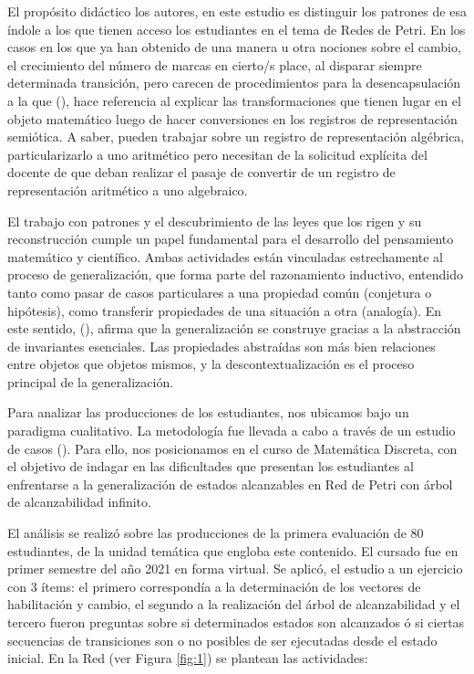 \documentclass[oneside,spanish]{amsart}
\numberwithin{equation}{section}
\theoremstyle{definition}
\begin{document}
El propósito didáctico los autores, en este estudio es distinguir los patrones de esa índole a los que tienen acceso los estudiantes en el tema de Redes de Petri. En los casos en los que ya han obtenido de una manera u otra nociones sobre el cambio, el crecimiento del número de marcas en cierto/s place, al disparar siempre determinada transición, pero carecen de procedimientos para la desencapsulación a la que (\citet{baez18}), hace referencia al explicar las transformaciones que tienen lugar en el objeto matemático luego de hacer conversiones en los registros de representación semiótica. A saber, pueden trabajar sobre un registro de representación algébrica, particularizarlo a uno aritmético pero necesitan de la solicitud explícita del docente de que deban realizar el pasaje de convertir de un registro de representación aritmético a uno algebraico.

El trabajo con patrones y el descubrimiento de las leyes que los rigen y su reconstrucción cumple un papel fundamental para el desarrollo del pensamiento matemático y científico. Ambas actividades están vinculadas estrechamente al proceso de generalización, que forma parte del razonamiento inductivo, entendido tanto como pasar de casos particulares a una propiedad común (conjetura o hipótesis), como transferir propiedades de una situación a otra (analogía). En este sentido, (\citet{polya66}), afirma que la generalización se construye gracias a la abstracción de invariantes esenciales. Las propiedades abstraídas son más bien relaciones entre objetos que objetos mismos, y la descontextualización es el proceso principal de la generalización.

Para analizar las producciones de los estudiantes, nos ubicamos bajo un paradigma cualitativo. La metodología fue llevada a cabo a través de un estudio de casos (\citet{stake78}). Para ello, nos posicionamos en el curso de Matemática Discreta, con el objetivo de indagar en las dificultades que presentan los estudiantes al enfrentarse a la generalización de estados alcanzables en Red de Petri con árbol de alcanzabilidad infinito.

El análisis se realizó sobre las producciones de la primera evaluación de 80 estudiantes, de la unidad temática que engloba este contenido. El cursado fue en primer semestre del año 2021 en forma virtual. Se aplicó, el estudio a un ejercicio con 3 ítems: el primero correspondía a la determinación de los vectores de habilitación y cambio, el segundo a la realización del árbol de alcanzabilidad y el tercero fueron preguntas sobre si determinados estados son alcanzados ó si ciertas secuencias de transiciones son o no posibles de ser ejecutadas desde el estado inicial. En la Red (ver Figura \ref{fig:1}) se plantean las actividades:
\end{document}
